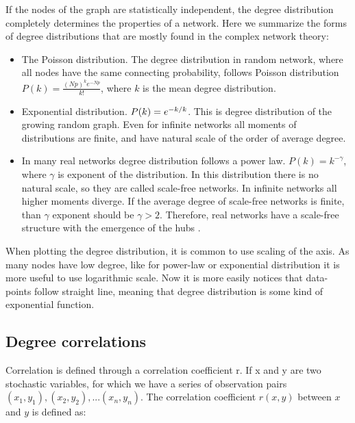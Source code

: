 If the nodes of the graph are statistically independent, the degree distribution completely determines the properties of a network. Here we summarize the forms of degree distributions that are mostly found in the complex network theory:
\begin{itemize}
	\item The Poisson distribution. The degree distribution in random network, where all nodes have the same connecting probability, follows Poisson distribution $P(k)= \frac{(Np)^ke^{-Np}}{k!}$, where $k$ is the mean degree distribution. 
	
	\item Exponential distribution. $P(k) = e^{-k/ \- k}$. This is degree distribution of the growing random graph. Even for infinite networks all moments of distributions are finite, and have natural scale of the order of average degree.
	
	\item In many real networks degree distribution follows a power law. $P(k) = k ^ {-\gamma} $, where $\gamma$ is exponent of the distribution. In this distribution there is no natural scale, so they are called scale-free networks. In infinite networks all higher moments diverge. If the average degree of scale-free networks is finite, than $\gamma$ exponent should be $\gamma>2$. Therefore, real networks have a scale-free structure with the emergence of the hubs \cite{newman2010}. 
\end{itemize}



When plotting the degree distribution, it is common to use scaling of the axis. As many nodes have  low degree, like for power-law or exponential distribution it is more useful to use logarithmic scale. Now it is more easily notices that data-points follow straight line, meaning that degree distribution is some kind of exponential function. 


\subsection{Degree correlations}

Correlation is defined through a correlation coefficient r. If x and y are two stochastic variables, for which we have a series of observation pairs $(x_1, y_1), (x_2, y_2), ... (x_n, y_n)$. The correlation coefficient $r(x, y)$ between $x$ and $y$ is defined as:

